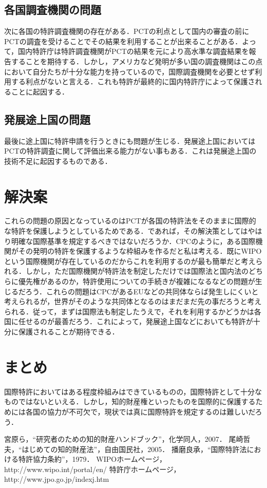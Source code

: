 \documentclass[11pt,a4paper]{jsarticle}
\begin{document}
  \subsection{各国調査機関の問題}
  次に各国の特許調査機関の存在がある．PCTの利点として国内の審査の前にPCTの調査を受けることでその結果を利用することが出来ることがある．よって，国内特許庁は特許調査機関がPCTの結果を元により高水準な調査結果を報告することを期待する．しかし，アメリカなど発明が多い国の調査機関はこの点において自分たちが十分な能力を持っているので，国際調査機関を必要とせず利用する利点がないと言える．これも特許が最終的に国内特許庁によって保護されることに起因する．
  
  \subsection{発展途上国の問題}
  最後に途上国に特許申請を行うときにも問題が生じる．発展途上国においてはPCTの特許調査に関して評価出来る能力がない事もある．これは発展途上国の技術不足に起因するものである．
  
  
 \section{解決案}
 これらの問題の原因となっているのはPCTが各国の特許法をそのままに国際的な特許を保護しようとしているためである．であれば，その解決策としてはやはり明確な国際基準を規定するべきではないだろうか．CPCのように，ある国際機関がその発明の特許を保護するような枠組みを作るだと私は考える．既にWIPOという国際機関が存在しているのだからこれを利用するのが最も簡単だと考えられる．しかし，ただ国際機関が特許法を制定しただけでは国際法と国内法のどちらに優先権があるのか，特許使用についての手続きが複雑になるなどの問題が生じるだろう．これらの問題はCPCがあるEUなどの共同体ならば発生しにくいと考えられるが，世界がそのような共同体となるのはまだまだ先の事だろうと考えられる．従って，まずは国際法も制定したうえで，それを利用するかどうかは各国に任せるのが最善だろう．これによって，発展途上国などにおいても特許が十分に保護されることが期待できる．


 \section{まとめ}
国際特許においてはある程度枠組みはできているものの，国際特許として十分なものではないといえる．しかし，知的財産権といったものを国際的に保護するためには各国の協力が不可欠で，現状では真に国際特許を規定するのは難しいだろう．

\begin{thebibliography}{9}
  宮原ら，``研究者のための知的財産ハンドブック''，化学同人，2007．
  尾崎哲夫，``はじめての知的財産法''，自由国民社，2005．
  播磨良承，``国際特許法における特許協力条約''，1979．
  WIPOホームページ，http://www.wipo.int/portal/en/
  特許庁ホームページ，http://www.jpo.go.jp/indexj.htm
\end{thebibliography}
\end{document}
